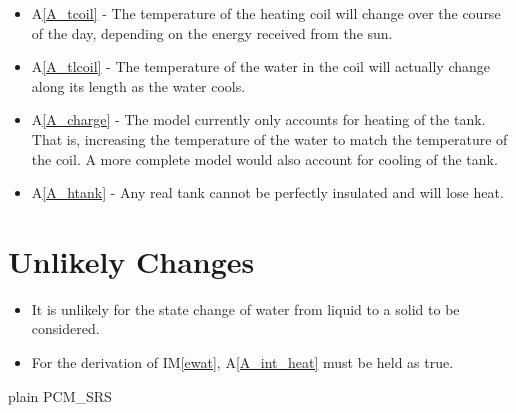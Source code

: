 \documentclass[12pt]{article}
\newcounter{ucnum}
\newcommand{\ltheucnum}{UC\theucnum}
\newcommand{\aref}[1]{A\ref{#1}}
\newcommand{\iref}[1]{IM\ref{#1}}
\newcounter{lcnum} %
\begin{document}
\noindent \begin{itemize}


\item[LC\refstepcounter{lcnum}\thelcnum \label{LC_tcoil}:]\aref{A_tcoil} - The
  temperature of the heating coil will change over the course of the day,
  depending on the energy received from the sun.

\item[LC\refstepcounter{lcnum}\thelcnum \label{LC_tlcoil}:]\aref{A_tlcoil} - The
  temperature of the water in the coil will actually change along its length as
  the water cools.

\item[LC\refstepcounter{lcnum}\thelcnum \label{LC_charge}:]\aref{A_charge} - The 
  model currently only accounts for heating of the tank. That is, increasing the 
  temperature of the water to match the temperature of the coil. A 
  more complete model would also account for cooling of the tank.


\item[LC\refstepcounter{lcnum}\thelcnum \label{LC_htank}:]\aref{A_htank} - Any
  real tank cannot be perfectly insulated and will lose heat.

\end{itemize}

\section{Unlikely Changes}

\begin{itemize}
\item[\refstepcounter{ucnum}\ltheucnum \label{UC_opRange}:] It is unlikely for the state change of water from liquid to a solid to be considered.
\item[\refstepcounter{ucnum}\ltheucnum \label{UC_intHeat}:] For the derivation of \iref{ewat}, \aref{A_int_heat} must be held as true. 
\end{itemize}

 {plain}
 {PCM_SRS}
\end{document}
